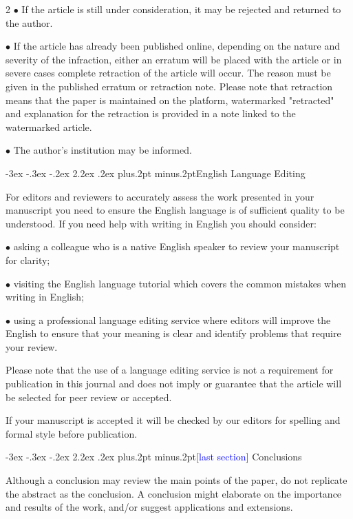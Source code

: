 \documentclass[twoside]{article}
\makeatletter
\def\section{\@startsection{section}{1}{\z@}%
 {-3ex \@plus -.3ex \@minus -.2ex}%
 {2.2ex \@plus.2ex}%
{\normalfont\normalsize\protect\baselineskip=14.5pt plus.2pt minus.2pt\bfseries}}
\makeatother
\begin{document}
\begin{multicols}{2}
$\bullet$ If the article is still under consideration, it may be rejected and returned
to the author.

$\bullet$ If the article has already been published online, depending on the nature
and severity of the infraction, either an erratum will be placed with the
article or in severe cases complete retraction of the article will occur.
The reason must be given in the published erratum or retraction note. Please
note that retraction means that the paper is maintained on the platform,
watermarked "retracted" and explanation for the retraction is provided in a
note linked to the watermarked article.

$\bullet$ The author's institution may be informed.

\section{English Language Editing}

For editors and reviewers to accurately assess the work presented in your manuscript you need to ensure the English language is of sufficient quality to be understood. If you need help with writing in English you should consider:

$\bullet$ asking a colleague who is a native English speaker to review your manuscript for clarity;

$\bullet$ visiting the English language tutorial which covers the common mistakes when writing in English;

$\bullet$ using a professional language editing service where editors will improve the English to ensure that your meaning is clear and  identify problems that require your review.

Please note that the use of a language editing service is not a requirement for publication in this journal and does not imply or guarantee that the article will be selected for peer review or accepted.

If your manuscript is accepted it will be checked by our editors for spelling and formal style before publication.

\section{[\textcolor{blue}{last section}] Conclusions}

Although a conclusion may review the main points of the paper, do not replicate the abstract as the conclusion. A conclusion might elaborate on the importance and results of the work, and/or suggest applications and extensions.


\end{multicols}
\end{document}
